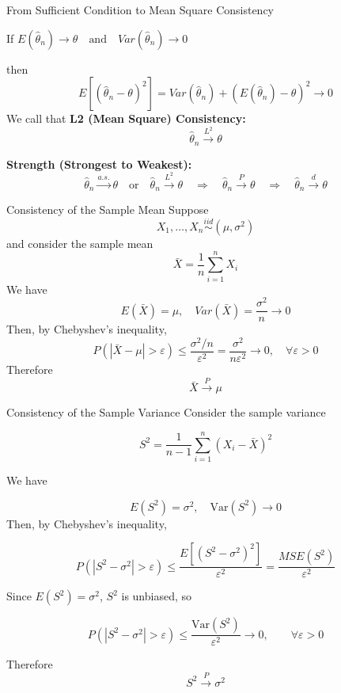 \documentclass[aspectratio=169,12pt]{beamer}
\begin{document}
\begin{frame}{From Sufficient Condition to Mean Square Consistency}

    If \quad $E(\hat{\theta}_n)\to\theta\quad\text{and}\quad Var(\hat{\theta}_n)\to 0$

    then
    $$
    E\left[(\hat{\theta}_n-\theta)^2\right]
    =Var(\hat{\theta}_n)+\left(E(\hat{\theta}_n)-\theta\right)^2\to0
    $$
    We call that
    \textbf{L2 (Mean Square) Consistency:}
    $$
    \hat{\theta}_n \xrightarrow{L^2} \theta
    $$

    \textbf{Strength (Strongest to Weakest):}
    $$
    \hat{\theta}_n \xrightarrow{a.s.} \theta\quad\text{or}\quad\hat{\theta}_n \xrightarrow{L^2} \theta
    \quad\Rightarrow\quad
    \hat{\theta}_n \xrightarrow{P} \theta
    \quad\Rightarrow\quad
    \hat{\theta}_n \xrightarrow{d} \theta
    $$
\end{frame}

\begin{frame}{Consistency of the Sample Mean}
Suppose $$X_1,\dots,X_n \overset{iid}{\sim} (\mu,\sigma^2)$$
and consider the sample mean $$\bar{X}=\frac1n\sum_{i=1}^nX_i$$
We have $$E(\bar{X})=\mu,\quad  Var(\bar{X})=\frac{\sigma^2}{n}\to0$$
Then, by Chebyshev's inequality,
$$P(|\bar{X}-\mu|>\varepsilon)\le\frac{\sigma^2/n}{\varepsilon^2}=\frac{\sigma^2}{n\varepsilon^2}\to0,\quad \forall \varepsilon>0$$
Therefore $$\bar{X}\xrightarrow{P}\mu$$
\end{frame}

\begin{frame}{Consistency of the Sample Variance}
Consider the sample variance

\vspace{-1em}
$$S^2=\frac{1}{n-1}\sum_{i=1}^n (X_i-\bar X)^2$$

\vspace{-1em}
We have

\vspace{-1em}
$$E(S^2)=\sigma^2,\quad\mathrm{Var}(S^2)\to 0$$
Then, by Chebyshev's inequality,

\vspace{-1em}
$$
P(|S^2-\sigma^2|>\varepsilon)
\le
\frac{E[(S^2-\sigma^2)^2]}{\varepsilon^2}
=
\frac{MSE(S^2)}{\varepsilon^2}
$$

Since \(E(S^2)=\sigma^2\), \(S^2\) is unbiased, so

\vspace{-1em}
$$
P(|S^2-\sigma^2|>\varepsilon)
\le
\frac{\mathrm{Var}(S^2)}{\varepsilon^2}
\to 0,
\qquad \forall \varepsilon>0
$$

Therefore
$$S^2 \xrightarrow{P} \sigma^2$$
\end{frame}
\end{document}
